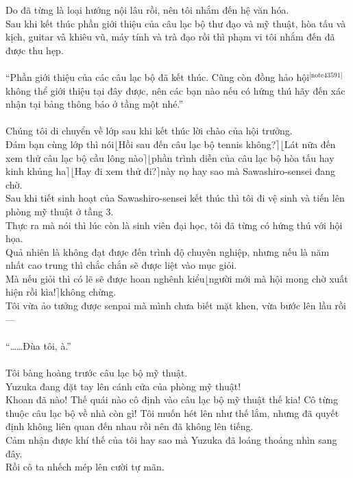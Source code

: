 \documentclass[12pt,a4paper, twosides]{book}
\begin{document}
Do đã từng là loại hướng nội lâu rồi, nên tôi nhắm đến hệ văn hóa.\\
Sau khi kết thúc phần giới thiệu của câu lạc bộ thư đạo và mỹ thuật, hòa tấu và kịch, guitar và khiêu vũ, máy tính và trà đạo rồi thì phạm vi tôi nhắm đến đã được thu hẹp.\\
\\
“Phần giới thiệu của các câu lạc bộ đã kết thúc. Cũng còn đồng hảo hội$^\text{[note43591]}$ không thể giới thiệu tại đây được, nên các bạn nào nếu có hứng thú hãy đến xác nhận tại bảng thông báo ở tầng một nhé.”\\
\\
Chúng tôi di chuyển về lớp sau khi kết thúc lời chào của hội trưởng.\\
Đám bạn cùng lớp thì nói$\lfloor$Hồi sau đến câu lạc bộ tennis không?$\rceil$$\lfloor$Lát nữa đến xem thử câu lạc bộ cầu lông nào$\rceil$$\lfloor$phần trình diễn của câu lạc bộ hòa tấu hay kinh khủng ha$\rceil$$\lfloor$Hay đi xem thử đi?$\rceil$này nọ hay sao mà Sawashiro-sensei đang chờ.\\
Sau khi tiết sinh hoạt của Sawashiro-sensei kết thúc thì tôi đi vệ sinh và tiến lên phòng mỹ thuật ở tầng 3.\\
Thực ra mà nói thì lúc còn là sinh viên đại học, tôi đã từng có hứng thú với hội họa.\\
Quả nhiên là không đạt được đến trình độ chuyên nghiệp, nhưng nếu là năm nhất cao trung thì chắc chắn sẽ được liệt vào mục giỏi.\\
Mà nếu giỏi thì có lẽ sẽ được hoan nghênh kiểu$\lfloor$người mới mà hội mong chờ xuất hiện rồi kìa!$\rceil$không chừng.\\
Tôi vừa ảo tưởng được senpai mà mình chưa biết mặt khen, vừa bước lên lầu rồi—\\
\\
“……Đùa tôi, à.”\\
\\
Tôi bàng hoàng trước câu lạc bộ mỹ thuật.\\
Yuzuka đang đặt tay lên cánh cửa của phòng mỹ thuật!\\
Khoan đã nào! Thế quái nào cô định vào câu lạc bộ mỹ thuật thế kia! Cô từng thuộc câu lạc bộ về nhà còn gì! Tôi muốn hét lên như thế lắm, nhưng đã quyết định không liên quan đến nhau rồi nên đã không lên tiếng.\\
Cảm nhận được khí thế của tôi hay sao mà Yuzuka đã loáng thoáng nhìn sang đây.\\
Rồi cô ta nhếch mép lên cười tự mãn.\\
$$
\end{document}
